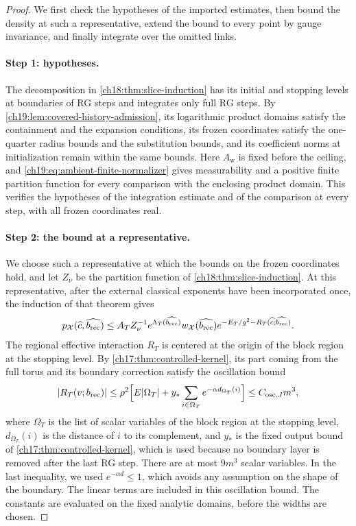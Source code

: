 \begin{proof}
We first check the hypotheses of the imported estimates, then bound the density at such a representative, extend the bound to every point by gauge invariance, and finally integrate over the omitted links.

\paragraph{Step 1: hypotheses.}
The decomposition in \cref{ch18:thm:slice-induction} has its initial and stopping levels at boundaries of RG steps and integrates only full RG steps. By \cref{ch19:lem:covered-history-admission}, its logarithmic product domains satisfy the containment and the expansion conditions, its frozen coordinates satisfy the one-quarter radius bounds and the substitution bounds, and its coefficient norms at initialization remain within the same bounds. Here $A_{\mathrm w}$ is fixed before the ceiling, and \eqref{ch19:eq:ambient-finite-normalizer} gives measurability and a positive finite partition function for every comparison with the enclosing product domain. This verifies the hypotheses of the integration estimate and of the comparison at every step, with all frozen coordinates real.

\paragraph{Step 2: the bound at a representative.}
We choose such a representative at which the bounds on the frozen coordinates hold, and let $Z_\nu$ be the partition function of \cref{ch18:thm:slice-induction}. At this representative, after the external classical exponents have been incorporated once, the induction of that theorem gives
\[
 p_{\mathcal X}(\widehat c,\widehat{b_{\mathrm{rec}}})\le A_TZ_\nu^{-1}e^{\Lambda_T(\widehat{b_{\mathrm{rec}}})}w_{\mathcal X}(\widehat{b_{\mathrm{rec}}})e^{-E_T/g^2-R_T(\widehat c;\widehat{b_{\mathrm{rec}}})}.
\]
The regional effective interaction $R_T$ is centered at the origin of the block region at the stopping level. By \cref{ch17:thm:controlled-kernel}, its part coming from the full torus and its boundary correction satisfy the oscillation bound
\[
 \lvert R_T(v;b_{\mathrm{rec}})\rvert\le\rho^2\Bigl[E\lvert \Omega_T\rvert+y_*\sum_{i\in\Omega_T}e^{-\alpha d_{\Omega_T}(i)}\Bigr]\le C_{\mathrm{osc},J}m^3,
\]
where $\Omega_T$ is the list of scalar variables of the block region at the stopping level, $d_{\Omega_T}(i)$ is the distance of $i$ to its complement, and $y_*$ is the fixed output bound of \cref{ch17:thm:controlled-kernel}, which is used because no boundary layer is removed after the last RG step. There are at most $9m^3$ scalar variables. In the last inequality, we used $e^{-\alpha d}\le1$, which avoids any assumption on the shape of the boundary. The linear terms are included in this oscillation bound. The constants are evaluated on the fixed analytic domains, before the widths are chosen.


\end{proof}
